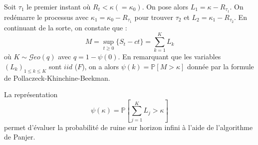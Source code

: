 
\begin{f}
	
	Soit \(\tau_1\) le premier instant où \(R_t<\kappa(=\kappa_0)\). On pose alors  \(L_1=\kappa -R_{\tau_1}\).
	On redémarre le processus avec \(\kappa_1=\kappa_0-R_{\tau_1}\) pour trouver  \(\tau_2\) et \(L_2=\kappa_1 -R_{\tau_2}\).
	En continuant de la sorte, on constate que :
	\[
	M=\sup_{t\geq 0}\{ S_t -ct \} =\sum_{k=1}^{K}L_k
	\]
	où \(K\sim \mathcal{G}eo(q)\) avec \(q=1-\psi(0)\).  
	En remarquant que les variables \(\left(  L_k\right)_{1\leq k\leq K}\) sont \(iid\) (\(F\)), on a alors \(\psi(k)=\mathbb{P}[M>\kappa]\) donnée par la formule de Pollaczeck-Khinchine-Beekman.
	
	
	La représentation 
	\[
	\psi(\kappa)=\mathbb{P}\left[\sum_{j = 1}^{K}L_j>\kappa \right] 
	\]
	permet d'évaluer la probabilité de ruine sur horizon infini à l'aide de l'algorithme de Panjer.
	
\end{f}





